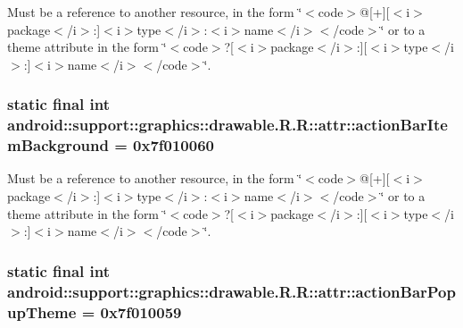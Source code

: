 Must be a reference to another resource, in the form \char`\"{}$<$code$>$@\mbox{[}+\mbox{]}\mbox{[}$<$i$>$package$<$/i$>$:\mbox{]}$<$i$>$type$<$/i$>$:$<$i$>$name$<$/i$>$$<$/code$>$\char`\"{} or to a theme attribute in the form \char`\"{}$<$code$>$?\mbox{[}$<$i$>$package$<$/i$>$:\mbox{]}\mbox{[}$<$i$>$type$<$/i$>$:\mbox{]}$<$i$>$name$<$/i$>$$<$/code$>$\char`\"{}. \hypertarget{classandroid_1_1support_1_1graphics_1_1drawable_1_1_r_1_1attr_b3de99945c9ecfe4fbe0cc1c06d5f036}{
\subsubsection[{actionBarItemBackground}]{\setlength{\rightskip}{0pt plus 5cm}static final int android::support::graphics::drawable.R.R::attr::actionBarItemBackground = 0x7f010060}}
\label{classandroid_1_1support_1_1graphics_1_1drawable_1_1_r_1_1attr_b3de99945c9ecfe4fbe0cc1c06d5f036}


Must be a reference to another resource, in the form \char`\"{}$<$code$>$@\mbox{[}+\mbox{]}\mbox{[}$<$i$>$package$<$/i$>$:\mbox{]}$<$i$>$type$<$/i$>$:$<$i$>$name$<$/i$>$$<$/code$>$\char`\"{} or to a theme attribute in the form \char`\"{}$<$code$>$?\mbox{[}$<$i$>$package$<$/i$>$:\mbox{]}\mbox{[}$<$i$>$type$<$/i$>$:\mbox{]}$<$i$>$name$<$/i$>$$<$/code$>$\char`\"{}. \hypertarget{classandroid_1_1support_1_1graphics_1_1drawable_1_1_r_1_1attr_719190405a664f0753615599a594b92d}{
\subsubsection[{actionBarPopupTheme}]{\setlength{\rightskip}{0pt plus 5cm}static final int android::support::graphics::drawable.R.R::attr::actionBarPopupTheme = 0x7f010059}}
\label{classandroid_1_1support_1_1graphics_1_1drawable_1_1_r_1_1attr_719190405a664f0753615599a594b92d}


